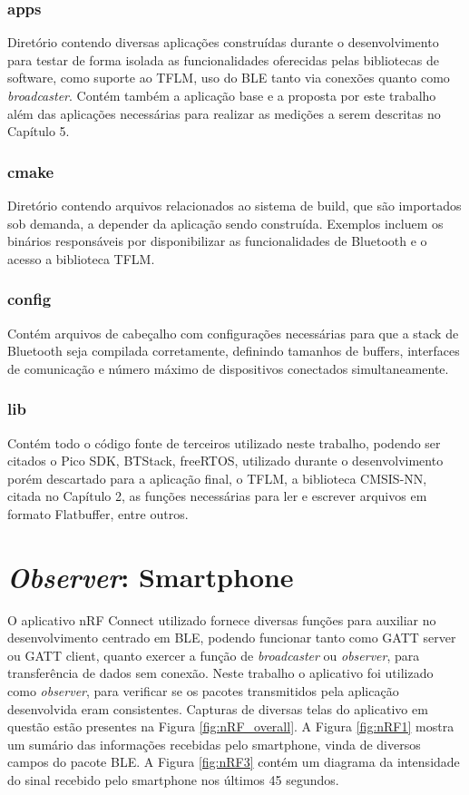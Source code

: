 \documentclass[a5paper]{ufsc-thesis}  %
\begin{document}
\subsubsection{apps}
Diretório contendo diversas aplicações construídas durante o desenvolvimento para testar de forma isolada as funcionalidades oferecidas pelas bibliotecas de software, como suporte ao TFLM, uso do BLE tanto via conexões quanto como \textit{broadcaster}. Contém também a aplicação base e a proposta por este trabalho além das aplicações necessárias para realizar as medições a serem descritas no Capítulo 5.

\subsubsection{cmake}
Diretório contendo arquivos relacionados ao sistema de build, que são importados sob demanda, a depender da aplicação sendo construída. Exemplos incluem os binários responsáveis por disponibilizar as funcionalidades de Bluetooth e o acesso a biblioteca TFLM.

\subsubsection{config}
Contém arquivos de cabeçalho com configurações necessárias para que a stack de Bluetooth seja compilada corretamente, definindo tamanhos de buffers, interfaces de comunicação e número máximo de dispositivos conectados simultaneamente.

\subsubsection{lib}
Contém todo o código fonte de terceiros utilizado neste trabalho, podendo ser citados o Pico SDK, BTStack, freeRTOS, utilizado durante o desenvolvimento porém descartado para a aplicação final, o TFLM, a biblioteca CMSIS-NN, citada no Capítulo 2, as funções necessárias para ler e escrever arquivos em formato Flatbuffer, entre outros.

\section{\textit{Observer}: Smartphone}
O aplicativo nRF Connect utilizado fornece diversas funções para auxiliar no desenvolvimento centrado em BLE, podendo funcionar tanto como GATT server ou GATT client, quanto exercer a função de \textit{broadcaster} ou \textit{observer}, para transferência de dados sem conexão. Neste trabalho o aplicativo foi utilizado como \textit{observer}, para verificar se os pacotes transmitidos pela aplicação desenvolvida eram consistentes. Capturas de diversas telas do aplicativo em questão estão presentes na Figura \ref{fig:nRF_overall}. A Figura \ref{fig:nRF1} mostra um sumário das informações recebidas pelo smartphone, vinda de diversos campos do pacote BLE. A Figura \ref{fig:nRF3} contém um diagrama da intensidade do sinal recebido pelo smartphone nos últimos 45 segundos.
\end{document}
